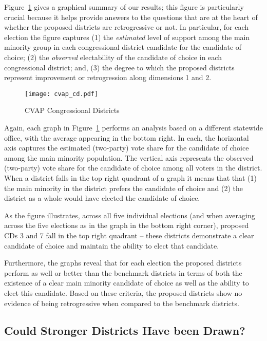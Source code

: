 \documentclass[12pt,draft]{scrartcl}
\begin{document}
Figure~\ref{cvap_cd} gives a graphical summary of our results; this
figure is particularly crucial because it helps provide answers to the
questions that are at the heart of whether the proposed districts are
retrogressive or not. In particular, for each election the figure
captures (1) the {\it estimated} level of support among the main
minority group in each congressional district candidate for the
candidate of choice; (2) the {\it observed} electability of the
candidate of choice in each congressional district; and, (3) the
degree to which the proposed districts represent improvement or
retrogression along dimensions 1 and 2.

\begin{figure}[p!h]
\begin{centering}
\texttt{[image: cvap\_cd.pdf]}
\caption{CVAP Congressional Districts}
\end{centering}
\label{cvap_cd}
\end{figure}

Again, each graph in Figure~\ref{cvap_cd} performs an analysis based
on a different statewide office, with the average appearing in the
bottom right.  In each, the horizontal axis captures the estimated
(two-party) vote share for the candidate of choice among the main
minority population. The vertical axis represents the observed
(two-party) vote share for the candidate of choice among all voters in
the district.  When a district falls in the top right quadrant of a
graph it means that that (1) the main minority in the district prefers
the candidate of choice and (2) the district as a whole would have
elected the candidate of choice.

As the figure illustrates, across all five individual elections (and
when averaging across the five elections as in the graph in the bottom
right corner), proposed CDs 3 and 7 fall in the top right quadrant --
these districts demonstrate a clear candidate of choice and maintain
the ability to elect that candidate.

Furthermore, the graphs reveal that for each election the proposed
districts perform as well or better than the benchmark districts in
terms of both the existence of a clear main minority candidate of
choice as well as the ability to elect this candidate. Based on these
criteria, the proposed districts show no evidence of being
retrogressive when compared to the benchmark districts.

\subsection{Could Stronger Districts Have been Drawn?}
\end{document}
